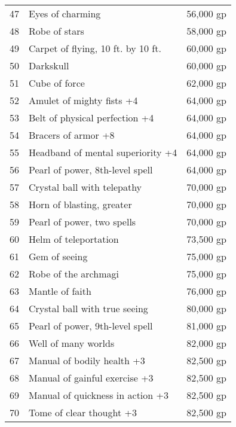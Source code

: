 \begin{xtabular}{lll}
47  & Eyes of charming                               & 56,000 gp    \\
48  & Robe of stars                                  & 58,000 gp    \\
49  & Carpet of flying, 10 ft. by 10 ft.             & 60,000 gp    \\
50  & Darkskull                                      & 60,000 gp    \\
51  & Cube of force                                  & 62,000 gp    \\
52  & Amulet of mighty fists +4                      & 64,000 gp    \\
53  & Belt of physical perfection +4                 & 64,000 gp    \\
54  & Bracers of armor +8                            & 64,000 gp    \\
55  & Headband of mental superiority +4              & 64,000 gp    \\
56  & Pearl of power, 8th-level spell                & 64,000 gp    \\
57  & Crystal ball with telepathy                    & 70,000 gp    \\
58  & Horn of blasting, greater                      & 70,000 gp    \\
59  & Pearl of power, two spells                     & 70,000 gp    \\
60  & Helm of teleportation                          & 73,500 gp    \\
61  & Gem of seeing                                  & 75,000 gp    \\
62  & Robe of the archmagi                           & 75,000 gp    \\
63  & Mantle of faith                                & 76,000 gp    \\
64  & Crystal ball with true seeing                  & 80,000 gp    \\
65  & Pearl of power, 9th-level spell                & 81,000 gp    \\
66  & Well of many worlds                            & 82,000 gp    \\
67  & Manual of bodily health +3                     & 82,500 gp    \\
68  & Manual of gainful exercise +3                  & 82,500 gp    \\
69  & Manual of quickness in action +3               & 82,500 gp    \\
70  & Tome of clear thought +3                       & 82,500 gp    \\

\end{xtabular}

